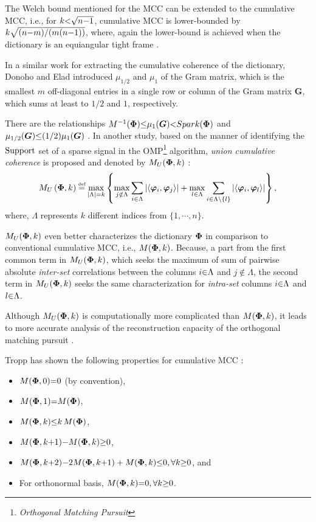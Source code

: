 The Welch bound mentioned for the MCC can be extended to the cumulative MCC, i.e., for $k {<} \sqrt{n {-} 1}$, cumulative MCC is lower-bounded by $k\sqrt{(n {-} m)/(m(n {-} 1))}$, where, again the lower-bound is achieved when the dictionary is an equiangular tight frame \cite{Schnass2008}.

In a similar work for extracting the cumulative coherence of the dictionary, Donoho and Elad introduced $\mu_{1/2}$ and $\mu_1$ of the Gram matrix, which is the smallest $m$ off-diagonal entries in a single row or column of the Gram matrix $\boldsymbol{G}$, which sums at least to $1/2$ and $1$, respectively.

There are the relationships $M^{-1}(\boldsymbol{\Phi}) {\leq} \mu_1(\boldsymbol{G}) {<} Spark(\boldsymbol{\Phi})$ and $\mu_{1/2}(\boldsymbol{G}) {\leq} (1/2) \mu_1(\boldsymbol{G})$ \cite{Donoho2003,Donoho2003a}.
\newpage
In another study, based on the manner of identifying the $\mathrm{Support}$ set of a sparse signal in the OMP\footnote{\emph{Orthogonal Matching Pursuit}} algorithm, \emph{union cumulative coherence} is proposed and denoted by $M_U(\boldsymbol{\Phi} , k)$ \cite{Dossal2005,Zhao2015a}:
\begin{gather*}
\label{eq:M_U} 
M_U\myparanthese{\myPhi , k} \myeq \max_{\myabs{\Lambda}=k} \mybrace{\max_{j \notin \Lambda} \sum_{i \in \Lambda} \myabs{ \left\langle \boldsymbol{\varphi}_i , \boldsymbol{\varphi}_{j} \right\rangle} + 
\max_{l \in \Lambda} \sum_{i \in \Lambda \backslash \{ l \}} \myabs{ \left\langle \boldsymbol{\varphi}_i , \boldsymbol{\varphi}_{l} \right\rangle}}, 
\end{gather*}
where, $\Lambda$ represents $k$ different indices from $\{1, \cdots, n\}$.

$M_U(\boldsymbol{\Phi} , k)$ even better characterizes the dictionary $\boldsymbol{\Phi}$ in comparison to conventional cumulative MCC, i.e., $M(\boldsymbol{\Phi} , k)$.
Because, a part from the first common term in $M_U(\boldsymbol{\Phi} , k)$, which seeks the maximum of sum of pairwise absolute \emph{inter-set} correlations between the columns $i {\in} \Lambda$ and $j {\notin} \Lambda$, the second term in $M_U(\boldsymbol{\Phi} , k)$ seeks the same characterization for \emph{intra-set} columns $i {\in} \Lambda$ and $l {\in} \Lambda$. 

Although $M_U(\boldsymbol{\Phi} , k)$ is computationally more complicated than $M(\boldsymbol{\Phi} , k)$, it leads to more accurate analysis of the reconstruction capacity of the orthogonal matching pursuit \cite{Zhao2015a}.

Tropp has shown the following properties for cumulative MCC \cite{Tropp2004}:
\begin{itemize}
\label{txt:CMCC-properties} 
\item $M(\boldsymbol{\Phi} , 0) {=} 0$ (by convention),
\item $M(\boldsymbol{\Phi} , 1) {=} M(\boldsymbol{\Phi})$,
\item $M(\boldsymbol{\Phi} , k) {\leq} k \, M(\boldsymbol{\Phi})$,
\item $M(\boldsymbol{\Phi} , k {+} 1) {-} M(\boldsymbol{\Phi} , k) {\geq} 0$,
\item $M(\boldsymbol{\Phi} , k {+} 2) {-} 2M(\boldsymbol{\Phi} , k {+} 1) + M(\boldsymbol{\Phi} , k) {\leq} 0, \forall k {\geq} 0$, and
\item For orthonormal basis, $M(\boldsymbol{\Phi} , k) {=} 0, \forall k {\geq} 0$. 
\end{itemize}

